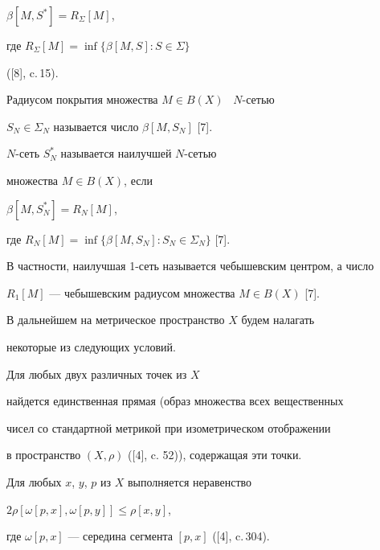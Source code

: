 $\beta [M,S^{*}] = R_{\Sigma}[M]$,


где $R_{\Sigma }[M] = \inf\{\beta [M,S] : S \in \Sigma \}$ 


([8], c.\,15). 





Радиусом покрытия множества $M \in B(X)$ \ $N$-сетью


$S_{N} \in \Sigma_{N}$ называется число $\beta [M,S_{N}]$ [7]. 


$N$-сеть $S^{*}_{N}$ называется наилучшей $N$-сетью


множества $M \in B(X)$, если 


$\beta [M,S^{*}_{N}] = R_{N}[M]$,


где $R_{N}[M] = \inf\{\beta [M,S_{N}] : S_{N} \in \Sigma_{N} \}$ [7]. 


В частности, наилучшая 1-сеть называется чебышевским центром, а число 


$R_{1}[M]$ --- чебышевским радиусом множества $M \in B(X)$ [7]. 





В дальнейшем на метрическое пространство $X$ будем налагать 


некоторые из следующих условий. 





\begin{cond}


Для любых двух различных точек из $X$ 


найдется единственная прямая (образ множества всех вещественных 


чисел со стандартной метрикой при изометрическом отображении 


в пространство $(X,\rho)$ ([4], c. 52)), содержащая эти точки. 


\end{cond}





\begin{cond}


Для любых $x$, $y$, $p$ из $X$ выполняется неравенство 


$2\rho [\omega [p,x],\omega [p,y]] \leq \rho [x,y]$, 


где $\omega [p,x]$ --- середина сегмента $[p,x]$ ([4], c.\,304). 


\end{cond}





